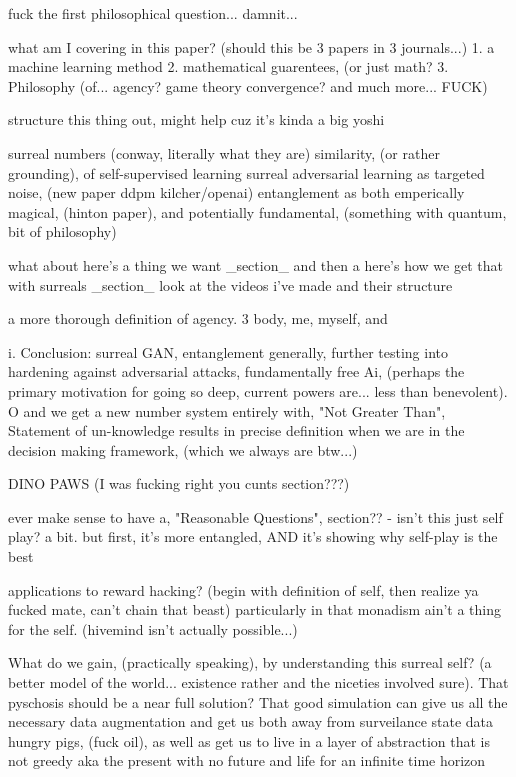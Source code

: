 \documentclass{article}
\begin{document}
fuck the first philosophical question... damnit...

what am I covering in this paper? (should this be 3 papers in 3 journals...)
1. a machine learning method
2. mathematical guarentees, (or just math?
3. Philosophy (of... agency? game theory convergence? and much more... FUCK) 


structure this thing out, might help cuz it's kinda a big yoshi

surreal numbers (conway, literally what they are)
similarity, (or rather grounding), of self-supervised learning
surreal adversarial learning as targeted noise, (new paper ddpm kilcher/openai)
entanglement as both emperically magical, (hinton paper), and potentially fundamental, (something with quantum, bit of philosophy)

what about here's a thing we want _section_ and then a here's how we get that with surreals _section_
look at the videos i've made and their structure

a more thorough definition of agency. 3 body, me, myself, and 

i. 
Conclusion: surreal GAN, entanglement generally, further testing into hardening against adversarial attacks, fundamentally free Ai, (perhaps the primary motivation for going so deep, current powers are... less than benevolent).  O and we get a new number system entirely with, "Not Greater Than", Statement of un-knowledge results in precise definition when we are in the decision making framework, (which we always are btw...)

DINO PAWS (I was fucking right you cunts section???)


ever make sense to have a, "Reasonable Questions", section??
 - isn't this just self play? a bit. but first, it's more entangled, AND it's showing why self-play is the best

applications to reward hacking? (begin with definition of self, then realize ya fucked mate, can't chain that beast)
	particularly in that monadism ain't a thing for the self. (hivemind isn't actually possible...)


What do we gain, (practically speaking), by understanding this surreal self? (a better model of the world... existence rather and the niceties involved sure). That pyschosis should be a near full solution? That good simulation can give us all the necessary data augmentation and get us both away from surveilance state data hungry pigs, (fuck oil), as well as get us to live in a layer of abstraction that is not greedy aka the present with no future and life for an infinite time horizon
\end{document}
